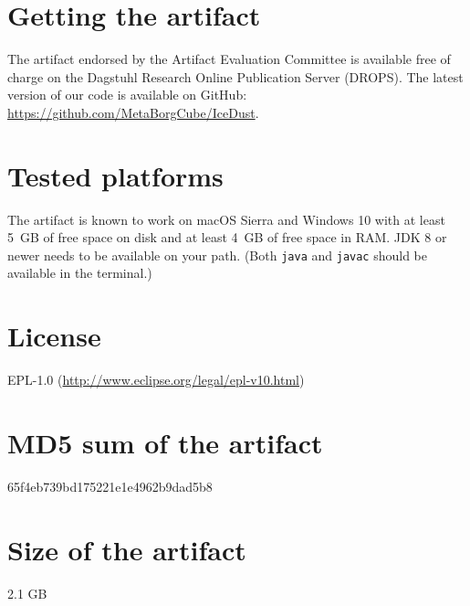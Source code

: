 \documentclass[a4paper,USenglish]{darts}
\newenvironment{getting}{\section{Getting the artifact} The artifact 
endorsed by the Artifact Evaluation Committee is available free of 
charge on the Dagstuhl Research Online Publication Server (DROPS).}{}
\newenvironment{platforms}{\section{Tested platforms}}{}
\newcommand{\license}[1]{{\section{License}#1}}
\newcommand{\mdsum}[1]{{\section{MD5 sum of the artifact}#1}}
\newcommand{\artifactsize}[1]{{\section{Size of the artifact}#1}}
\begin{document}
\begin{getting}
  The latest version of our code is available on GitHub: {\url {https://github.com/MetaBorgCube/IceDust}}.
\end{getting} 

\begin{platforms}
  The artifact is known to work on macOS Sierra and Windows 10 with at least 5~GB of free
  space on disk and at least 4~GB of free space in RAM.
  JDK 8 or newer needs to be available on your path. (Both {\tt java} and {\tt javac} should be available in the terminal.)
\end{platforms}

\license{EPL-1.0 ({\url {http://www.eclipse.org/legal/epl-v10.html}})}

\mdsum{65f4eb739bd175221e1e4962b9dad5b8}

\artifactsize{2.1 GB}









%

\end{document}
